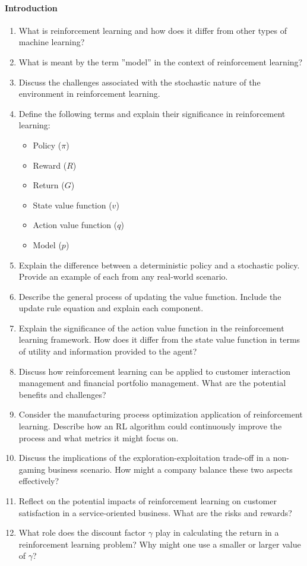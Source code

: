 \paragraph*{Introduction}
\begin{enumerate}[nosep]
\item What is reinforcement learning and how does it differ from other types of machine learning?
\item What is meant by the term ''model'' in the context of reinforcement learning?
\item Discuss the challenges associated with the stochastic nature of the environment in reinforcement learning.
\item Define the following terms and explain their significance in reinforcement learning:
\begin{itemize}
\item Policy ($\pi$)
\item Reward ($R$)
\item Return ($G$)
\item State value function ($v$)
\item Action value function ($q$)
\item Model ($p$)
\end{itemize}
\item Explain the difference between a deterministic policy and a stochastic policy. Provide an example of each from any real-world scenario.
\item Describe the general process of updating the value function. Include the update rule equation and explain each component.
\item Explain the significance of the action value function in the reinforcement learning framework. How does it differ from the state value function in terms of utility and information provided to the agent?
\item Discuss how reinforcement learning can be applied to customer interaction management and financial portfolio management. What are the potential benefits and challenges?
\item Consider the manufacturing process optimization application of reinforcement learning. Describe how an RL algorithm could continuously improve the process and what metrics it might focus on.
\item Discuss the implications of the exploration-exploitation trade-off in a non-gaming business scenario. How might a company balance these two aspects effectively?
\item Reflect on the potential impacts of reinforcement learning on customer satisfaction in a service-oriented business. What are the risks and rewards?
\item What role does the discount factor $\gamma$ play in calculating the return in a reinforcement learning problem? Why might one use a smaller or larger value of $\gamma$?
\end{enumerate}

